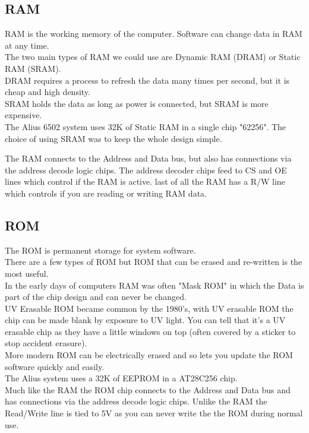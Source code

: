 \documentclass{ol-softwaremanual}
\begin{document}
\begin{ffcode}
\subsection{RAM}
RAM is the working memory of the computer. Software can change data in RAM at any time.\\
The two main types of RAM we could use are Dynamic RAM (DRAM) or Static RAM (SRAM).\\
DRAM requires a process to refresh the data many times per second, but it is cheap and high density.\\
SRAM holds the data as long as power is connected, but SRAM is more expensive.\\

The Alius 6502 system uses 32K of Static RAM in a single chip "62256". The choice of using SRAM was to keep the whole design simple.

The RAM connects to the Address and Data bus, but also has connections via the address decode logic chips. The address decoder chips feed to CS and OE lines which control if the RAM is active. last of all the RAM has a R/W line which controls if you are reading or writing RAM data.
\pagebreak

\subsection{ROM}
The ROM is permanent storage for system software.\\
There are a few types of ROM but ROM that can be erased and re-written is the most useful.\\
In the early days of computers RAM was often "Mask ROM" in which the Data is part of the chip design and can never be changed.\\
UV Erasable ROM became common by the 1980's, with UV erasable ROM the chip can be made blank by exposure to UV light. You can tell that it's a UV erasable chip as they have a little windows on top (often covered by a sticker to stop accident erasure).\\
More modern ROM can be electrically erased and so lets you update the ROM software quickly and easily.\\
The Alius system uses a 32K of EEPROM in a AT28C256 chip.\\
Much like the RAM the ROM chip connects to the Address and Data bus and has connections via the address decode logic chips. Unlike the RAM the Read/Write line is tied to 5V as you can never write the the ROM during normal use.


\end{ffcode}
\end{document}

